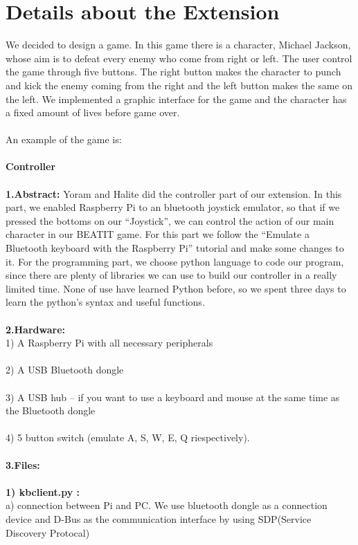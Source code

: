\documentclass[a4paper]{article}
\begin{document}
\section{Details about the Extension}
We decided to design a game. In this game there is a character, Michael Jackson, whose aim is to defeat every enemy who come from right or left. The user control the game through five buttons. The right button makes the character to punch and kick the enemy coming from the right and the left button makes the same on the left. We implemented a graphic interface for the game and the character has a fixed amount of lives before game over. 
\\\\
An example of the game is: \\\\
\textbf{Controller}\\\\
\textbf{1.Abstract:}  Yoram and Halite did the controller part of our extension. In this part, we enabled Raspberry Pi to an bluetooth joystick emulator, so that if we pressed the bottoms on our “Joystick”, we can control the action of our main character in our BEATIT game. For this part we follow the “Emulate a Bluetooth keyboard with the Raspberry Pi” tutorial and make some changes to it. 
For the programming part, we choose python language to code our program, since there are plenty of libraries we can use to build our controller in a really limited time. None of use have learned Python before, so we spent three days to learn the python’s syntax and useful functions.
\\\\
\textbf{2.Hardware:}\\
1) A Raspberry Pi with all necessary peripherals   \\\\
2) A USB Bluetooth dongle \\\\
3) A USB hub – if you want to use a keyboard and mouse at the same time as the Bluetooth dongle  \\\\
4) 5 button switch (emulate A, S, W, E, Q riespectively).  \\\\
\textbf{3.Files:} \\\\
\textbf{1) kbclient.py :}\\
a) connection between Pi and PC. We use bluetooth dongle as a connection device and D-Bus as the communication interface by using SDP(Service Discovery Protocal)
\end{document}
